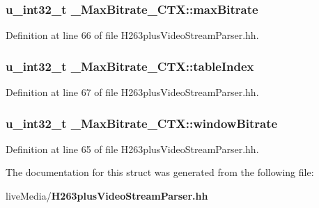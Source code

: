 \subsubsection[{max\+Bitrate}]{\setlength{\rightskip}{0pt plus 5cm}u\+\_\+int32\+\_\+t \+\_\+\+Max\+Bitrate\+\_\+\+C\+T\+X\+::max\+Bitrate}\label{struct__MaxBitrate__CTX_afbd9b7ef3fb8ed0a9aa6f63b1f8d0efe}


Definition at line 66 of file H263plus\+Video\+Stream\+Parser.\+hh.

\subsubsection[{table\+Index}]{\setlength{\rightskip}{0pt plus 5cm}u\+\_\+int32\+\_\+t \+\_\+\+Max\+Bitrate\+\_\+\+C\+T\+X\+::table\+Index}\label{struct__MaxBitrate__CTX_ae187abfcb62ffe1b198e8d4817525296}


Definition at line 67 of file H263plus\+Video\+Stream\+Parser.\+hh.

\subsubsection[{window\+Bitrate}]{\setlength{\rightskip}{0pt plus 5cm}u\+\_\+int32\+\_\+t \+\_\+\+Max\+Bitrate\+\_\+\+C\+T\+X\+::window\+Bitrate}\label{struct__MaxBitrate__CTX_ae47f09161254a122651fefc0964ecb94}


Definition at line 65 of file H263plus\+Video\+Stream\+Parser.\+hh.



The documentation for this struct was generated from the following file\+:\begin{DoxyCompactItemize}
\item 
live\+Media/{\bf H263plus\+Video\+Stream\+Parser.\+hh}\end{DoxyCompactItemize}
